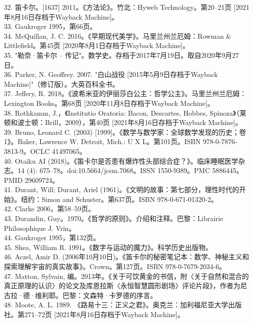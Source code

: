32. 笛卡尔。[1637] 2011。《方法论》。竹北：Hyweb Technology。第20–21页 [2021年8月16日存档于Wayback Machine]。\\
33. Gaukroger 1995，第66页。\\
34. McQuillan, J. C. 2016。《早期现代美学》。马里兰州兰厄姆：Rowman & Littlefield。第45页 [2020年8月1日存档于Wayback Machine]。\\
35. "勒奈·笛卡尔 – 传记"。数学史。存档于2017年7月19日。取自2020年9月27日。\\
36. Parker, N. Geoffrey. 2007. "白山战役 [2015年5月9日存档于Wayback Machine]"（修订版）。大英百科全书。\\
37. Jeffery, R. 2018。《波希米亚的伊丽莎白公主：哲学公主》。马里兰州兰厄姆：Lexington Books。第68页 [2020年11月8日存档于Wayback Machine]。\\
38. Rothkamm, J.，《Institutio Oratoria: Bacon, Descartes, Hobbes, Spinoza》（莱顿和波士顿：Brill，2009），第40页 [2021年8月16日存档于Wayback Machine]。\\
39. Bruno, Leonard C. (2003) [1999]。《数学与数学家：全球数学发现的历史；卷1》。Baker, Lawrence W. Detroit, Mich.: U X L。第101页。ISBN 978-0-7876-3813-9。OCLC 41497065。\\
40. Otaiku AI (2018)。《笛卡尔是否患有爆炸性头部综合症？》。临床睡眠医学杂志。14 (4): 675–78。doi:10.5664/jcsm.7068。ISSN 1550-9389。PMC 5886445。PMID 29609724。\\
41. Durant, Will; Durant, Ariel (1961)。《文明的故事：第七部分，理性时代的开始》。纽约：Simon and Schuster。第637页。ISBN 978-0-671-01320-2。\\
42. Clarke 2006，第58–59页。\\
43. Durandin, Guy。1970。《哲学的原则》。介绍和注释。巴黎：Librairie Philosophique J. Vrin。\\
44. Gaukroger 1995，第132页。\\
45. Shea, William R. 1991。《数字与运动的魔力》。科学历史出版物。\\
46. Aczel, Amir D. (2006年10月10日)。《笛卡尔的秘密笔记本：数学、神秘主义和探索理解宇宙的真实故事》。Crown。第127页。ISBN 978-0-7679-2034-6。\\
47. Matton, Sylvain, 编。2013年。《关于可饮黄金的书信，附〈关于自然和混合的真正原理的认识〉的论文及库恩拉斯〈永恒智慧圆形剧场〉评论片段》，作者为尼古拉·德·维利耶。巴黎：文森特·卡罗德的序言。\\
48. Moote, A. L. 1989. 《路易十三：正义之君》。奥克兰：加利福尼亚大学出版社。第271–72页 [2021年8月16日存档于Wayback Machine]。\\

